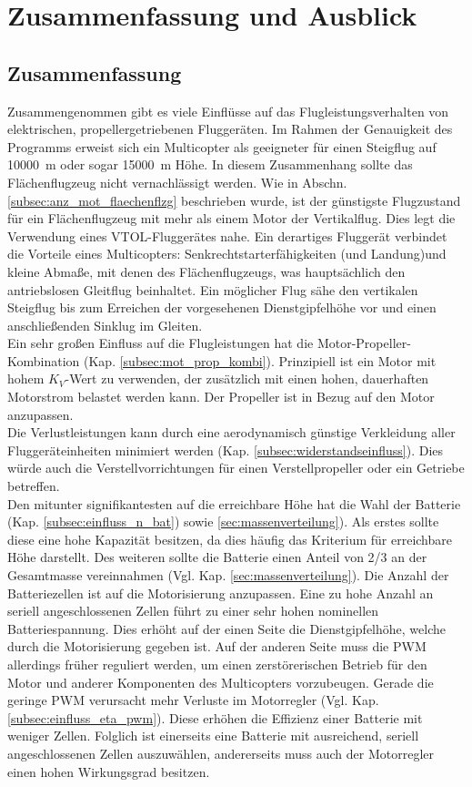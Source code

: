 \chapter{Zusammenfassung und Ausblick}

\section{Zusammenfassung}
Zusammengenommen gibt es viele Einflüsse auf das Flugleistungsverhalten von elektrischen, propellergetriebenen Fluggeräten. 
Im Rahmen der Genauigkeit des Programms erweist sich ein Multicopter als geeigneter für einen Steigflug auf \SI{10000}{m} oder sogar \SI{15000}{m} Höhe. In diesem Zusammenhang sollte das Flächenflugzeug nicht vernachlässigt werden. Wie in Abschn. \ref{subsec:anz_mot_flaechenflzg} beschrieben wurde, ist der günstigste Flugzustand für ein Flächenflugzeug mit mehr als einem Motor der Vertikalflug. Dies legt die Verwendung eines VTOL-Fluggerätes nahe. Ein derartiges Fluggerät verbindet die Vorteile eines Multicopters: Senkrechtstarterfähigkeiten (und Landung)und kleine Abmaße, mit denen des Flächenflugzeugs, was hauptsächlich den antriebslosen Gleitflug beinhaltet. Ein möglicher Flug sähe den vertikalen Steigflug bis zum Erreichen der vorgesehenen Dienstgipfelhöhe vor und einen anschließenden Sinklug im Gleiten. \\
Ein sehr großen Einfluss auf die Flugleistungen hat die Motor-Propeller-Kombination (Kap. \ref{subsec:mot_prop_kombi}). Prinzipiell ist ein Motor mit hohem \ensuremath{K_V}-Wert zu verwenden, der zusätzlich mit einen hohen, dauerhaften Motorstrom belastet werden kann. Der Propeller ist in Bezug auf den Motor anzupassen. \\
Die Verlustleistungen kann durch eine aerodynamisch günstige Verkleidung aller Fluggeräteinheiten minimiert werden (Kap. \ref{subsec:widerstandseinfluss}). Dies würde auch die Verstellvorrichtungen für einen Verstellpropeller oder ein Getriebe betreffen. \\
Den mitunter signifikantesten auf die erreichbare Höhe hat die Wahl der Batterie (Kap. \ref{subsec:einfluss_n_bat}) sowie \ref{sec:massenverteilung}). Als erstes sollte diese eine hohe Kapazität besitzen, da dies häufig das Kriterium für erreichbare Höhe darstellt. Des weiteren sollte die Batterie einen Anteil von 2/3 an der Gesamtmasse vereinnahmen (Vgl. Kap. \ref{sec:massenverteilung}). Die Anzahl der Batteriezellen ist auf die Motorisierung anzupassen. Eine zu hohe Anzahl an seriell angeschlossenen Zellen führt zu einer sehr hohen nominellen Batteriespannung. Dies erhöht auf der einen Seite die Dienstgipfelhöhe, welche durch die Motorisierung gegeben ist. Auf der anderen Seite muss die PWM allerdings früher reguliert werden, um einen zerstörerischen Betrieb für den Motor und anderer Komponenten des Multicopters vorzubeugen. Gerade die geringe PWM verursacht mehr Verluste im Motorregler (Vgl. Kap. \ref{subsec:einfluss_eta_pwm}). Diese erhöhen die Effizienz einer Batterie mit weniger Zellen. Folglich ist einerseits eine Batterie mit ausreichend, seriell angeschlossenen Zellen auszuwählen, andererseits muss auch der Motorregler einen hohen Wirkungsgrad besitzen.\\
